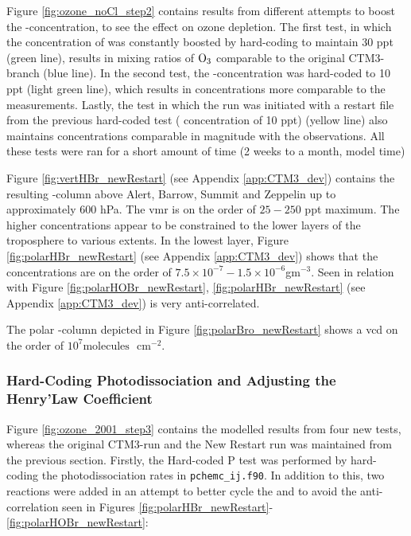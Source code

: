 \medskip

Figure \ref{fig:ozone_noCl_step2} contains results from different attempts to boost the -concentration, to see the effect on ozone depletion. The first test, in which the concentration of  was constantly boosted by hard-coding to maintain 30 ppt (green line), results in mixing ratios of $\mathrm{O_3}$ comparable to the original CTM3-branch (blue line). In the second test, the -concentration was hard-coded to 10 ppt (light green line), which results in concentrations more comparable to the measurements. Lastly, the test in which the run was initiated with a restart file from the previous hard-coded test ( concentration of 10 ppt) (yellow line) also maintains concentrations comparable in magnitude with the observations. All these tests were ran for a short amount of time (2 weeks to a month, model time)



\medskip

Figure \ref{fig:vertHBr_newRestart} (see Appendix \ref{app:CTM3_dev}) contains the resulting -column above Alert, Barrow, Summit and Zeppelin up to approximately $600$ hPa. The \acrshort{vmr} is on the order of $25 - 250$ ppt maximum. The higher concentrations appear to be constrained to the lower layers of the troposphere to various extents. In the lowest layer, Figure \ref{fig:polarHBr_newRestart} (see Appendix \ref{app:CTM3_dev}) shows that the concentrations are on the order of $7.5\times10^{-7} - 1.5\times10^{-6}$gm$^{-3}$. Seen in relation with Figure \ref{fig:polarHOBr_newRestart}, \ref{fig:polarHBr_newRestart} (see Appendix \ref{app:CTM3_dev}) is very anti-correlated. 



\medskip

The polar -column depicted in Figure \ref{fig:polarBro_newRestart} shows a \acrshort{vcd} on the order of $10^7 \text{molecules }$ cm$^{-2}$. 

\clearpage
\subsubsection{Hard-Coding Photodissociation and Adjusting the Henry'Law Coefficient}\label{sec:res_step3}

Figure \ref{fig:ozone_2001_step3} contains the modelled results from four new tests, whereas the original CTM3-run and the New Restart run was maintained from the previous section. Firstly, the Hard-coded P test was performed by hard-coding the photodissociation rates in \texttt{pchemc\_ij.f90}. In addition to this, two reactions were added in an attempt to better cycle the  and  to avoid the anti-correlation seen in Figures \ref{fig:polarHBr_newRestart}-\ref{fig:polarHOBr_newRestart}:  

